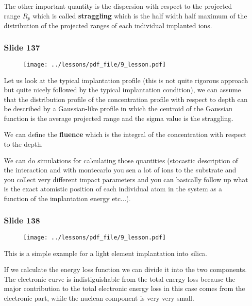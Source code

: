 \documentclass[../main/main.tex]{subfiles}
\begin{document}
The other important quantity is the dispersion with respect to the projected range \( R_p \) which is called \textbf{straggling} which is the half width half maximum of the distribution of the projected ranges of each individual implanted ions.

\newpage

\subsubsection{Slide 137}

\begin{figure}[h!]
\centering
\texttt{[image: ../lessons/pdf\_file/9\_lesson.pdf]}
\end{figure}

Let us look at the typical implantation profile (this is not quite rigorous approach but quite nicely followed by the typical implantation condition), we can assume that the distribution profile of the concentration profile with respect to depth can be described by a Gaussian-like profile in which the centroid of the Gaussian function is the average projected range and the sigma value is the straggling.

We can define the \textbf{fluence} which is the integral of the concentration with respect to the depth.

We can do simulations for calculating those quantities (stocastic description of the interaction and with montecarlo you sen a lot of ions to the substrate and you collect very different impact parameters and you can basically follow up what is the exact atomistic position of each individual atom in the system as a function of the implantation energy etc...).

\newpage

\subsubsection{Slide 138}

\begin{figure}[h!]
\centering
\texttt{[image: ../lessons/pdf\_file/9\_lesson.pdf]}
\end{figure}

This is a simple example for a light element implantation into silica.

If we calculate the energy loss function we can divide it into the two components. The electronic curve is indistiguishable from the total energy loss because the major contribution to the total electronic energy loss in this case comes from the electronic part, while the nuclean component is very very small.
\end{document}
